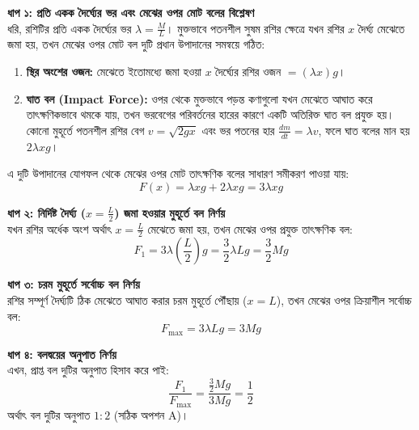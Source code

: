 \documentclass[12pt, a4paper]{article}
\begin{document}
\begin{tcolorbox}[solutionbox={সমাধান (Solution)}]
\noindent
\textbf{ধাপ ১: প্রতি একক দৈর্ঘ্যের ভর এবং মেঝের ওপর মোট বলের বিশ্লেষণ} \\
ধরি, রশিটির প্রতি একক দৈর্ঘ্যের ভর $\lambda = \frac{M}{L}$। মুক্তভাবে পতনশীল সুষম রশির ক্ষেত্রে যখন রশির $x$ দৈর্ঘ্য মেঝেতে জমা হয়, তখন মেঝের ওপর মোট বল দুটি প্রধান উপাদানের সমন্বয়ে গঠিত:
\begin{enumerate}[label=(\roman*), leftmargin=1cm, itemsep=0.2em]
    \item \textbf{স্থির অংশের ওজন:} মেঝেতে ইতোমধ্যে জমা হওয়া $x$ দৈর্ঘ্যের রশির ওজন $= (\lambda x) g$।
    \item \textbf{ঘাত বল (Impact Force):} ওপর থেকে মুক্তভাবে পড়ন্ত কণাগুলো যখন মেঝেতে আঘাত করে তাৎক্ষণিকভাবে থমকে যায়, তখন ভরবেগের পরিবর্তনের হারের কারণে একটি অতিরিক্ত ঘাত বল প্রযুক্ত হয়। কোনো মুহূর্তে পতনশীল রশির বেগ $v = \sqrt{2gx}$ এবং ভর পতনের হার $\frac{dm}{dt} = \lambda v$, ফলে ঘাত বলের মান হয় $2\lambda x g$।
\end{enumerate}
এ দুটি উপাদানের যোগফল থেকে মেঝের ওপর মোট তাৎক্ষণিক বলের সাধারণ সমীকরণ পাওয়া যায়:
\[ F(x) = \lambda x g + 2\lambda x g = 3 \lambda x g \]

\vspace{0.5em}
\noindent
\textbf{ধাপ ২: নির্দিষ্ট দৈর্ঘ্য ($x = \frac{L}{2}$) জমা হওয়ার মুহূর্তে বল নির্ণয়} \\
যখন রশির অর্ধেক অংশ অর্থাৎ $x = \frac{L}{2}$ মেঝেতে জমা হয়, তখন মেঝের ওপর প্রযুক্ত তাৎক্ষণিক বল:
\[ F_1 = 3 \lambda \left(\frac{L}{2}\right) g = \frac{3}{2} \lambda L g = \frac{3}{2} M g \]

\vspace{0.5em}
\noindent
\textbf{ধাপ ৩: চরম মুহূর্তে সর্বোচ্চ বল নির্ণয়} \\
রশির সম্পূর্ণ দৈর্ঘ্যটি ঠিক মেঝেতে আঘাত করার চরম মুহূর্তে পৌঁছায় ($x = L$), তখন মেঝের ওপর ক্রিয়াশীল সর্বোচ্চ বল:
\[ F_{\max} = 3 \lambda L g = 3 M g \]

\vspace{0.5em}
\noindent
\textbf{ধাপ ৪: বলদ্বয়ের অনুপাত নির্ণয়} \\
এখন, প্রাপ্ত বল দুটির অনুপাত হিসাব করে পাই:
\[ \frac{F_1}{F_{\max}} = \frac{\frac{3}{2} M g}{3 M g} = \frac{1}{2} \]
অর্থাৎ বল দুটির অনুপাত $1 : 2$ (সঠিক অপশন A)।
\end{tcolorbox}

\newpage
\end{document}
